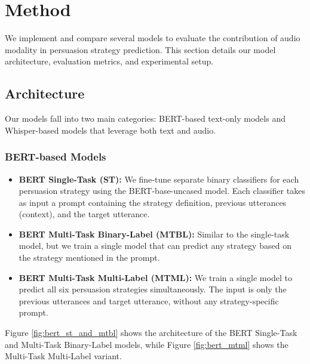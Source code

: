 \documentclass{article}
\begin{document}
\section{Method}
We implement and compare several models to evaluate the contribution of audio modality in persuasion strategy prediction. This section details our model architecture, evaluation metrics, and experimental setup.

\subsection{Architecture}
Our models fall into two main categories: BERT-based text-only models and Whisper-based models that leverage both text and audio.

\subsubsection{BERT-based Models}
\begin{itemize}
    \item \textbf{BERT Single-Task (ST):} We fine-tune separate binary classifiers for each persuasion strategy using the BERT-base-uncased model. Each classifier takes as input a prompt containing the strategy definition, previous utterances (context), and the target utterance.
    
    \item \textbf{BERT Multi-Task Binary-Label (MTBL):} Similar to the single-task model, but we train a single model that can predict any strategy based on the strategy mentioned in the prompt.
    
    \item \textbf{BERT Multi-Task Multi-Label (MTML):} We train a single model to predict all six persuasion strategies simultaneously. The input is only the previous utterances and target utterance, without any strategy-specific prompt.
\end{itemize}

Figure \ref{fig:bert_st_and_mtbl} shows the architecture of the BERT Single-Task and Multi-Task Binary-Label models, while Figure \ref{fig:bert_mtml} shows the Multi-Task Multi-Label variant.
\end{document}
